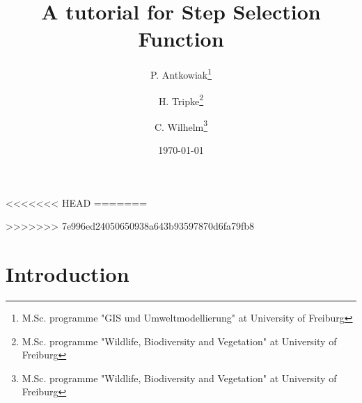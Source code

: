 \documentclass[11pt, a4paper]{article} %
\begin{document}
<<<<<<< HEAD
=======

>>>>>>> 7e996ed24050650938a643b93597870d6fa79fb8


\title{A tutorial for Step Selection Function}

\author{P. Antkowiak\thanks{M.Sc. programme "GIS und Umweltmodellierung" at University of Freiburg} \and H. Tripke\thanks{M.Sc. programme "Wildlife, Biodiversity and Vegetation" at University of Freiburg} \and C. Wilhelm\thanks{M.Sc. programme "Wildlife, Biodiversity and Vegetation" at University of Freiburg}}

\date{\today} %

\maketitle


\tableofcontents

\newpage

\section{Introduction}%
\end{document}
